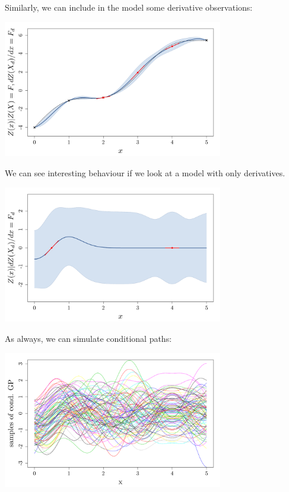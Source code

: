 \documentclass{beamer}
\begin{document}
\begin{frame}{}
Similarly, we can include in the model some derivative observations:
	\begin{center}
	\includegraphics[height=6cm]{figures/R/exotic_der}
	\end{center}
\end{frame}

\begin{frame}{}
We can see interesting behaviour if we look at a model with only derivatives.
	\begin{center}
	\includegraphics[height=6cm]{figures/R/exotic_deronly}
	\end{center}
\end{frame}

\begin{frame}{}
As always, we can simulate conditional paths:
	\begin{center}
	\includegraphics[height=6cm]{figures/R/exotic_simul}
	\end{center}
\end{frame}
\end{document}
